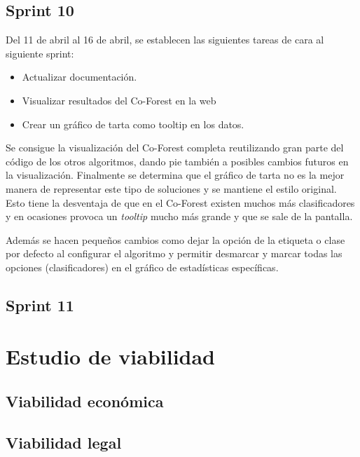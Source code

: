 \subsection{Sprint 10}
Del 11 de abril al 16 de abril, se establecen las siguientes tareas de cara al siguiente sprint:
 \begin{itemize}
	\item Actualizar documentación.
	\item Visualizar resultados del Co-Forest en la web
	\item Crear un gráfico de tarta como tooltip en los datos.
\end{itemize}
Se consigue la visualización del Co-Forest completa reutilizando gran parte del código de los otros algoritmos, dando pie también a posibles cambios futuros en la visualización. Finalmente se determina que el gráfico de tarta no es la mejor manera de representar este tipo de soluciones y se mantiene el estilo original. Esto tiene la desventaja de que en el Co-Forest existen muchos más clasificadores y en ocasiones provoca un \textit{tooltip} mucho más grande y que se sale de la pantalla. 

Además se hacen pequeños cambios como dejar la opción de la etiqueta o clase por defecto al configurar el algoritmo y permitir desmarcar y marcar todas las opciones (clasificadores) en el gráfico de estadísticas específicas.

\subsection{Sprint 11}


\section{Estudio de viabilidad}

\subsection{Viabilidad económica}

\subsection{Viabilidad legal}

